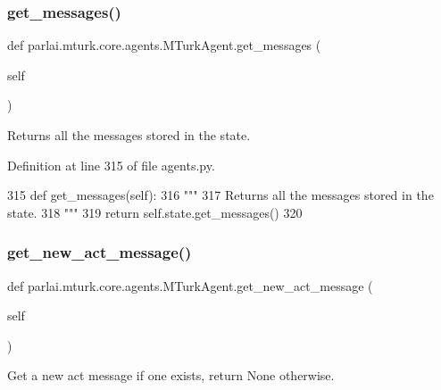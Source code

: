 \subsubsection{\texorpdfstring{get\+\_\+messages()}{get\_messages()}}
{\footnotesize\ttfamily def parlai.\+mturk.\+core.\+agents.\+M\+Turk\+Agent.\+get\+\_\+messages (\begin{DoxyParamCaption}\item[{}]{self }\end{DoxyParamCaption})}

\begin{DoxyVerb}Returns all the messages stored in the state.
\end{DoxyVerb}
 

Definition at line 315 of file agents.\+py.


\begin{DoxyCode}
315     \textcolor{keyword}{def }get\_messages(self):
316         \textcolor{stringliteral}{"""}
317 \textcolor{stringliteral}{        Returns all the messages stored in the state.}
318 \textcolor{stringliteral}{        """}
319         \textcolor{keywordflow}{return} self.state.get\_messages()
320 
\end{DoxyCode}
\mbox{\label{classparlai_1_1mturk_1_1core_1_1agents_1_1MTurkAgent_a04758a4244229d4978a92573ec538883}} 
\subsubsection{\texorpdfstring{get\+\_\+new\+\_\+act\+\_\+message()}{get\_new\_act\_message()}}
{\footnotesize\ttfamily def parlai.\+mturk.\+core.\+agents.\+M\+Turk\+Agent.\+get\+\_\+new\+\_\+act\+\_\+message (\begin{DoxyParamCaption}\item[{}]{self }\end{DoxyParamCaption})}

\begin{DoxyVerb}Get a new act message if one exists, return None otherwise.
\end{DoxyVerb}
 

